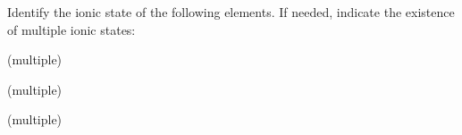 \documentclass[main.tex]{subfiles}
\begin{document}
\begin{multicols*}{2}
\begin{question}[ID=\the\value{numA}]
Identify the ionic state of the following elements. If needed, indicate the existence of multiple ionic states:
\begin{inparaenum}[(a)]
\item {} %
\item {} %
\item {} %
\item {} %
\item {} %
\item {} %
\item {} %
\end{inparaenum}
\end{question}
\begin{solution}
\begin{inparaenum}[(a)]
\item {}  
\item {}   (multiple)
\item {}   
\item {}  
\item {}   (multiple)
\item {}  
\item {}   (multiple)
\end{inparaenum}\hspace{0.1cm}\end{solution}





\end{multicols*}
\end{document}
